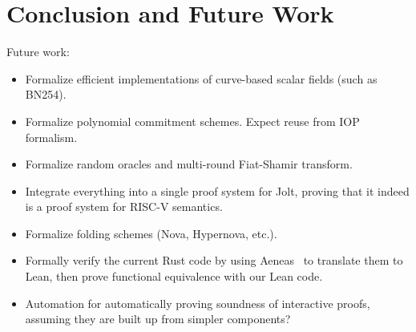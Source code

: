 \section{Conclusion and Future Work}

Future work:
\begin{itemize}
    \item Formalize efficient implementations of curve-based scalar fields (such as BN254).
    \item Formalize polynomial commitment schemes. Expect reuse from IOP formalism.
    \item Formalize random oracles and multi-round Fiat-Shamir transform.
    \item Integrate everything into a single proof system for Jolt, proving that it indeed is a proof system for RISC-V semantics.
    \item Formalize folding schemes (Nova, Hypernova, etc.).
    \item Formally verify the current Rust code by using Aeneas~\cite{} to translate them to Lean, then prove functional equivalence with our Lean code.
    \item Automation for automatically proving soundness of interactive proofs, assuming they are built up from simpler components?
\end{itemize}